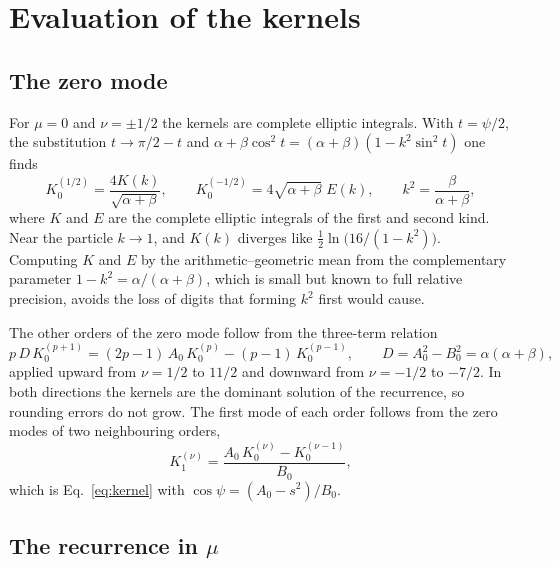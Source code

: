 \documentclass[11pt]{article}
\newcommand{\Kmn}[2]{K_{#1}^{(#2)}}
\begin{document}
\section{Evaluation of the kernels}
\label{sec:kernels}

\subsection{The zero mode}

For $\mu=0$ and $\nu=\pm1/2$ the kernels are complete elliptic integrals. With
$t=\psi/2$, the substitution $t\to\pi/2-t$ and
$\alpha+\beta\cos^2t=(\alpha+\beta)(1-k^2\sin^2t)$ one finds
\begin{equation}
  \label{eq:elliptic}
  \Kmn{0}{1/2} = \frac{4K(k)}{\sqrt{\alpha+\beta}}, \qquad
  \Kmn{0}{-1/2} = 4\sqrt{\alpha+\beta}\;E(k), \qquad k^2=\frac{\beta}{\alpha+\beta},
\end{equation}
where $K$ and $E$ are the complete elliptic integrals of the first and second
kind. Near the particle $k\to1$, and $K(k)$ diverges like
$\tfrac12\ln\bigl(16/(1-k^2)\bigr)$. Computing $K$ and $E$ by the
arithmetic--geometric mean from the complementary parameter
$1-k^2=\alpha/(\alpha+\beta)$, which is small but known to full relative
precision, avoids the loss of digits that forming $k^2$ first would cause.

The other orders of the zero mode follow from the three-term relation
\begin{equation}
  \label{eq:nu_recurrence}
  p\,D\,\Kmn{0}{p+1} = (2p-1)\,A_0\,\Kmn{0}{p} - (p-1)\,\Kmn{0}{p-1}, \qquad
  D = A_0^2-B_0^2 = \alpha(\alpha+\beta),
\end{equation}
applied upward from $\nu=1/2$ to $11/2$ and downward from $\nu=-1/2$ to
$-7/2$. In both directions the kernels are the dominant solution of the
recurrence, so rounding errors do not grow. The first mode of each order
follows from the zero modes of two neighbouring orders,
\begin{equation}
  \label{eq:K1}
  \Kmn{1}{\nu} = \frac{A_0\,\Kmn{0}{\nu}-\Kmn{0}{\nu-1}}{B_0},
\end{equation}
which is Eq.~\eqref{eq:kernel} with $\cos\psi=(A_0-s^2)/B_0$.

\subsection{The recurrence in \texorpdfstring{$\mu$}{mu}}
\label{sec:mu}
\end{document}
